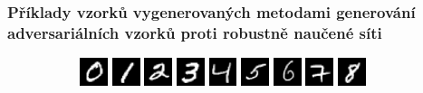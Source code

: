 \documentclass[czech]{beamer}
\begin{document}
\begin{frame}
    \frametitle{Příklady vzorků vygenerovaných metodami generování adversariálních vzorků proti robustně naučené síti}
    \begin{figure}
        \begin{subfigure}[b]{\textwidth}
            \includegraphics[width=0.09\textwidth]{Images/Graphics/AEXAMPLES/R_ALLGEN/benign_1.png}
            \includegraphics[width=0.09\textwidth]{Images/Graphics/AEXAMPLES/R_ALLGEN/benign_3.png}
            \includegraphics[width=0.09\textwidth]{Images/Graphics/AEXAMPLES/R_ALLGEN/benign_5.png}
            \includegraphics[width=0.09\textwidth]{Images/Graphics/AEXAMPLES/R_ALLGEN/benign_7.png}
            \includegraphics[width=0.09\textwidth]{Images/Graphics/AEXAMPLES/R_ALLGEN/benign_2.png}
            \includegraphics[width=0.09\textwidth]{Images/Graphics/AEXAMPLES/R_ALLGEN/benign_34.png}
            \includegraphics[width=0.09\textwidth]{Images/Graphics/AEXAMPLES/R_ALLGEN/benign_18.png}
            \includegraphics[width=0.09\textwidth]{Images/Graphics/AEXAMPLES/R_ALLGEN/benign_37.png}
            \includegraphics[width=0.09\textwidth]{Images/Graphics/AEXAMPLES/R_ALLGEN/benign_17.png}

\end{subfigure}
\end{figure}
\end{frame}
\end{document}
